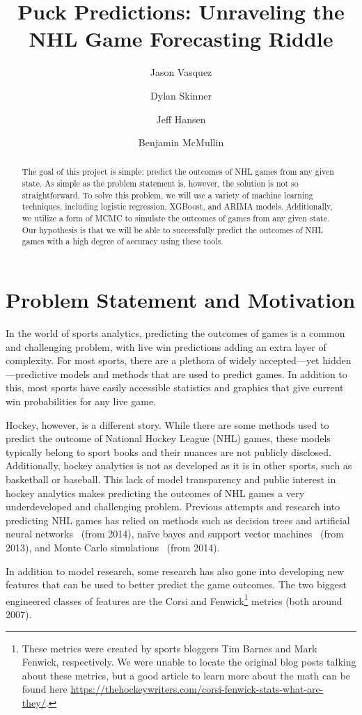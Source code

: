 \documentclass[11pt]{article}
\title{Puck Predictions: Unraveling the NHL Game Forecasting Riddle}
\author{Jason Vasquez \and Dylan Skinner \and Jeff Hansen \and Benjamin McMullin}
\begin{document}
\maketitle

\begin{abstract}
    The goal of this project is simple: predict the outcomes of NHL games from any given state.
    As simple as the problem statement is, however, the solution is not so straightforward.
    To solve this problem, we will use a variety of machine learning techniques, including logistic regression,
    XGBoost, and ARIMA models. Additionally, we utilize a form of MCMC to simulate the outcomes of games from any given
    state. Our hypothesis is that we will be able to successfully predict the outcomes of NHL games with a high degree of accuracy
    using these tools.
\end{abstract}

\section{Problem Statement and Motivation}
In the world of sports analytics, predicting the outcomes of games is a common and challenging problem, with live win predictions adding
an extra layer of complexity. For most sports, there are a plethora of widely accepted—yet hidden—predictive models and methods that are used to
predict games. In addition to this, most sports have easily accessible statistics and graphics that give current win probabilities for any live game.

Hockey, however, is a different story. While there are some methods used to predict the outcome of National Hockey League (NHL) games, these models
typically belong to sport books and their nuances are not publicly disclosed. Additionally, hockey analytics is not as
developed as it is in other sports, such as basketball or baseball. This lack of model transparency and public interest in hockey analytics
makes predicting the outcomes of NHL games a very underdeveloped and challenging problem. Previous attempts and research into predicting NHL games
has relied on methods such as decision trees and artificial neural networks~\cite{pishcedda} (from 2014), naïve bayes and support vector machines~\cite{weissbock2013use} (from 2013),
and Monte Carlo simulations~\cite{Weissbock2014ForecastingSI} (from 2014).

In addition to model research, some research has also gone into developing new features that can be used to better predict the game outcomes. 
The two biggest engineered classes of features are the Corsi
 and Fenwick\footnote{These metrics were created by sports bloggers Tim Barnes and Mark Fenwick, respectively. 
 We were unable to locate the original blog posts talking about these metrics, but a good article to learn more about the math can be
 found here \url{https://thehockeywriters.com/corsi-fenwick-stats-what-are-they/}.} metrics (both around 2007). 
\end{document}
